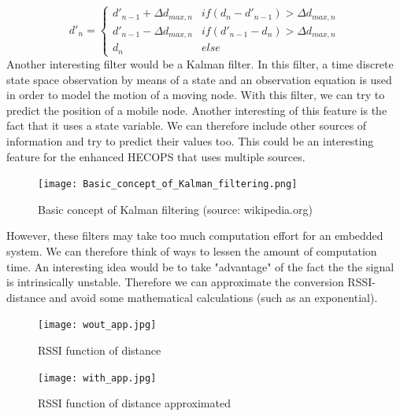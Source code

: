 \documentclass[a4paper,10pt]{article}
\begin{document}
$$
d'_n = \left\{ \begin{array}{ll}
                d'_{n-1} + \Delta d_{max,n} & if (d_n - d'_{n-1}) > \Delta d_{max,n} \\
                d'_{n-1} - \Delta d_{max,n} & if (d'_{n-1} - d_n) > \Delta d_{max,n} \\
                d_n & else 
               \end{array}
\right.
$$
Another interesting filter would be a Kalman filter. In this filter, a time discrete state space observation by means of a state and an
observation equation is used in order to model the motion of a moving node. With this filter, we can try to predict the position of a mobile
node. Another interesting of this feature is the fact that it uses a state variable. We can therefore include other sources of information and
try to predict their values too. This could be an interesting feature for the enhanced HECOPS that uses multiple sources.\\
\begin{figure}[H]
\centering
 \texttt{[image: Basic\_concept\_of\_Kalman\_filtering.png]}
\caption{Basic concept of Kalman filtering (source: wikipedia.org)}
\end{figure}
\noindent
However, these filters may take too much computation effort for an embedded system. We can therefore think of ways to lessen the amount of
computation time. An interesting idea would be to take "advantage" of the fact the the signal is intrinsically unstable. Therefore we can
approximate the conversion RSSI-distance and avoid some mathematical calculations (such as an exponential).
\begin{figure}[H]
\centering
 \texttt{[image: wout\_app.jpg]}
\caption{RSSI function of distance}
\end{figure}
\begin{figure}[H]
\centering
 \texttt{[image: with\_app.jpg]}
\caption{RSSI function of distance approximated}
\end{figure}
\end{document}
